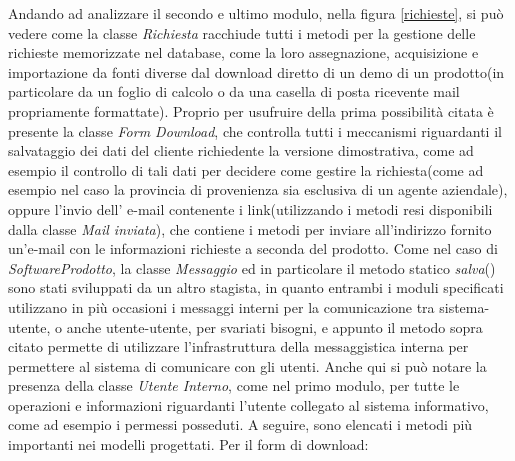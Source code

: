 \noindent
Andando ad analizzare il secondo e ultimo modulo, nella figura \ref{richieste}, si pu\`o vedere come la classe \textit{Richiesta} racchiude tutti i metodi per la gestione delle richieste memorizzate nel database, come la loro assegnazione, acquisizione e importazione da fonti diverse dal download diretto di un demo di un prodotto(in particolare da un foglio di calcolo o da una casella di posta ricevente mail propriamente formattate). Proprio per usufruire della prima possibilit\`a citata \`e presente la classe \textit{Form Download}, che controlla tutti i meccanismi riguardanti il salvataggio dei dati del cliente richiedente la versione dimostrativa, come ad esempio il controllo di tali dati per decidere come gestire la richiesta(come ad esempio nel caso la provincia di provenienza sia esclusiva di un agente aziendale), oppure l'invio dell' e-mail contenente i link(utilizzando i metodi resi disponibili dalla classe \textit{Mail inviata}), che contiene i metodi per inviare all'indirizzo fornito un'e-mail con le informazioni richieste a seconda del prodotto. Come nel caso di \textit{SoftwareProdotto}, la classe \textit{Messaggio} ed in particolare il metodo statico \textit{salva}() sono stati sviluppati da un altro stagista, in quanto entrambi i moduli specificati utilizzano in pi\`u occasioni i messaggi interni per la comunicazione tra sistema-utente, o anche utente-utente, per svariati bisogni, e appunto il metodo sopra citato permette di utilizzare l'infrastruttura della messaggistica interna per permettere al sistema di comunicare con gli utenti. Anche qui si pu\`o notare la presenza della classe \textit{Utente Interno}, come nel primo modulo, per tutte le operazioni e informazioni riguardanti l'utente collegato al sistema informativo, come ad esempio i permessi posseduti.
A seguire, sono elencati i metodi pi\`u importanti nei modelli progettati.
Per il form di download:

